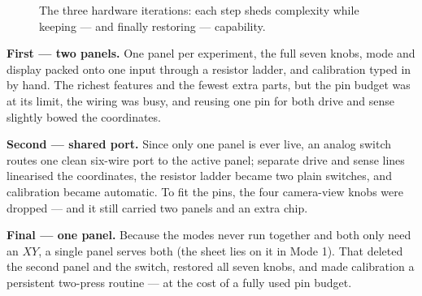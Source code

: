 \documentclass[11pt]{report}
\begin{document}
\begin{figure}[ht]
\centering
{}
\caption{The three hardware iterations: each step sheds complexity while keeping --- and finally restoring --- capability.}
\label{fig:evolution}
\end{figure}

\textbf{First --- two panels.} One panel per experiment, the full seven knobs, mode and display packed onto one input through a resistor ladder, and calibration typed in by hand. The richest features and the fewest extra parts, but the pin budget was at its limit, the wiring was busy, and reusing one pin for both drive and sense slightly bowed the coordinates.

\textbf{Second --- shared port.} Since only one panel is ever live, an analog switch routes one clean six-wire port to the active panel; separate drive and sense lines linearised the coordinates, the resistor ladder became two plain switches, and calibration became automatic. To fit the pins, the four camera-view knobs were dropped --- and it still carried two panels and an extra chip.

\textbf{Final --- one panel.} Because the modes never run together and both only need an $XY$, a single panel serves both (the sheet lies on it in Mode 1). That deleted the second panel and the switch, restored all seven knobs, and made calibration a persistent two-press routine --- at the cost of a fully used pin budget.
\end{document}
